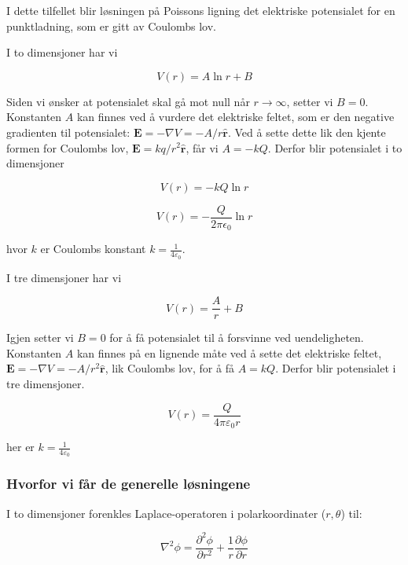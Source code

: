 I dette tilfellet blir løsningen på Poissons ligning det elektriske potensialet for en punktladning, som er gitt av Coulombs lov.

I to dimensjoner har vi

\begin{equation*}
V(r) = A \ln r + B
\end{equation*}

Siden vi ønsker at potensialet skal gå mot null når $r \rightarrow \infty$, setter vi $B = 0$. Konstanten $A$ kan finnes ved å vurdere det elektriske feltet, som er den negative gradienten til potensialet: $\mathbf{E} = -\nabla V = -A/r \mathbf{\hat{r}}$. Ved å sette dette lik den kjente formen for Coulombs lov, $\mathbf{E} = kq/r^2 \mathbf{\hat{r}}$, får vi $A = -kQ$. Derfor blir potensialet i to dimensjoner

\begin{equation*}
V(r) = -kQ \ln r
\end{equation*}

\begin{equation*}
    V(r) = - \frac{Q}{2\pi \epsilon_0} \ln r
    \end{equation*}

hvor $k$ er Coulombs konstant $k=\frac{1}{4\varepsilon_0}$.

I tre dimensjoner har vi

\begin{equation*}
V(r) = \frac{A}{r} + B
\end{equation*}

Igjen setter vi $B = 0$ for å få potensialet til å forsvinne ved uendeligheten. Konstanten $A$ kan finnes på en lignende måte ved å sette det elektriske feltet, $\mathbf{E} = -\nabla V = -A/r^2 \mathbf{\hat{r}}$, lik Coulombs lov, for å få $A = kQ$. Derfor blir potensialet i tre dimensjoner.

\begin{equation*}
V(r) = \frac{Q}{4\pi \varepsilon_0 r}
\end{equation*}

her er $k=\frac{1}{4\varepsilon_0}$
\subsubsection*{Hvorfor vi får de generelle løsningene}
I to dimensjoner forenkles Laplace-operatoren i polarkoordinater ($r, \theta$) til:

\begin{equation*}
\nabla^2 \phi = \frac{\partial^2 \phi}{\partial r^2} + \frac{1}{r} \frac{\partial \phi}{\partial r}
\end{equation*}

